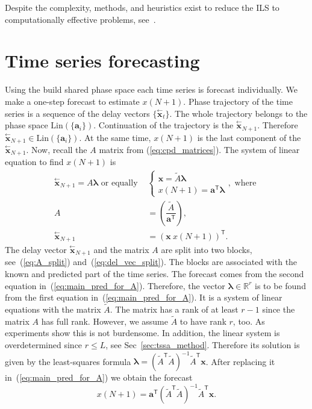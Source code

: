 \documentclass[referee, pdflatex, sn-mathphys-num]{sn-jnl}
\theoremstyle{definition}
\theoremstyle{plain}
\newcommand{\delayV}[1]{\overset{\leftarrow}{\mathbf{x}}_{#1}}
\begin{document}
	Despite the complexity, methods, and heuristics exist to reduce the ILS to computationally effective problems, see~\cite{Grafarend2022}.
	
	\section{Time series forecasting}\label{sec:tssa_forecast}
	
	Using the build shared phase space each time series is forecast individually. We make a one-step forecast to estimate $ x(N + 1) $. Phase trajectory of the time series is a sequence of the delay vectors $ \{ \delayV{t} \} $. The whole trajectory belongs to the phase space $ \text{Lin}(\{\mathbf{a}_i\}) $. Continuation of the trajectory is the $ \delayV{N + 1} $. Therefore $ \delayV{N + 1} \in \text{Lin}(\{\mathbf{a}_i\}) $. At the same time, $ x(N + 1) $ is the last component of the $ \delayV{N + 1} $. Now, recall the $ A $ matrix from (\ref{eq:cpd_matrices}). The system of linear equation to find $ x(N + 1) $ is \begin{align}\label{eq:main_pred_for_A}
		\delayV{N + 1} = A \boldsymbol{\lambda} \text{ or equally } &\begin{cases}
			\mathbf{x} = \tilde{A} \boldsymbol{\lambda}  \\
			x(N + 1) = \mathbf{a}^{\mathsf{T}} \boldsymbol{\lambda}
		\end{cases}, \text{ where } \\
		A &= \left( \dfrac{\tilde{A}}{\mathbf{a}^{\mathsf{T}}} \right), \label{eq:A_split} \\
		\delayV{N + 1} &= (\mathbf{x} \  x(N + 1))^{\mathsf{T}}. \label{eq:del_vec_split}
	\end{align}	The delay vector $ \delayV{N + 1} $ and the matrix $ A $ are split into two blocks, see~(\ref{eq:A_split}) and~(\ref{eq:del_vec_split}). The blocks are associated with the known and predicted part of the time series. The forecast comes from the second equation in~(\ref{eq:main_pred_for_A}). Therefore, the vector $ \boldsymbol{\lambda} \in \mathbb{R}^r $ is to be found from the first equation in~(\ref{eq:main_pred_for_A}). It is a system of linear equations with the matrix $ \tilde{A} $. The matrix has a rank of at least $ r - 1 $ since the matrix $A$  has full rank. However, we assume $ \tilde{A} $ to have rank $ r $, too. As experiments show this is not burdensome. In addition, the linear system is overdetermined since $ r \le L $, see  Sec~\ref{sec:tssa_method}. Therefore its solution is given by the least-squares formula $ \boldsymbol{\lambda} = (\tilde{A}^{\mathsf{T}} \tilde{A})^{-1} \tilde{A}^{\mathsf{T}} \mathbf{x} $. After replacing it in~(\ref{eq:main_pred_for_A}) we obtain the forecast \begin{equation}\label{eq:tssa_pred}
		x(N + 1) = \mathbf{a}^{\mathsf{T}} (\tilde{A}^{\mathsf{T}} \tilde{A})^{-1} \tilde{A}^{\mathsf{T}} \mathbf{x}.
	\end{equation}
	
\end{document}
